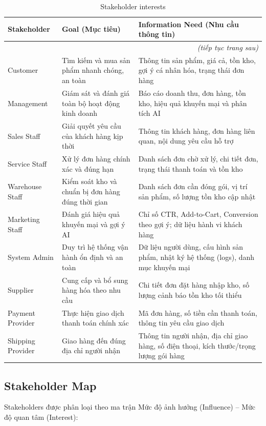 \documentclass[12pt,a4paper,oneside]{report}
\begin{document}
\begin{longtable}{p{3.2cm}p{5cm}p{7.8cm}}
\caption{Stakeholder interests}\\
\toprule
\textbf{Stakeholder} & \textbf{Goal (Mục tiêu)} & \textbf{Information Need (Nhu cầu thông tin)} \\
\midrule
\endhead
\midrule
\multicolumn{3}{r}{\emph{(tiếp tục trang sau)}} \\
\endfoot
\bottomrule
\endlastfoot
Customer & Tìm kiếm và mua sản phẩm nhanh chóng, an toàn & Thông tin sản phẩm, giá cả, tồn kho, gợi ý cá nhân hóa, trạng thái đơn hàng \\
Management & Giám sát và đánh giá toàn bộ hoạt động kinh doanh & Báo cáo doanh thu, đơn hàng, tồn kho, hiệu quả khuyến mại và phân tích AI \\
Sales Staff &  Giải quyết yêu cầu của khách hàng kịp thời &  Thông tin khách hàng, đơn hàng liên quan, nội dung yêu cầu hỗ trợ \\
Service Staff & Xử lý đơn hàng chính xác và đúng hạn & Danh sách đơn chờ xử lý, chi tiết đơn, trạng thái thanh toán và tồn kho \\
Warehouse Staff & Kiểm soát kho và chuẩn bị đơn hàng đúng thời gian & Danh sách đơn cần đóng gói, vị trí sản phẩm, số lượng tồn kho cập nhật \\
Marketing Staff & Đánh giá hiệu quả khuyến mại và gợi ý AI & Chỉ số CTR, Add-to-Cart, Conversion theo gợi ý; dữ liệu hành vi khách hàng \\
System Admin & Duy trì hệ thống vận hành ổn định và an toàn & Dữ liệu người dùng, cấu hình sản phẩm, nhật ký hệ thống (logs), danh mục khuyến mại \\
Supplier & Cung cấp và bổ sung hàng hóa theo nhu cầu & Chi tiết đơn đặt hàng nhập kho, số lượng cảnh báo tồn kho tối thiểu \\
Payment Provider & Thực hiện giao dịch thanh toán chính xác & Mã đơn hàng, số tiền cần thanh toán, thông tin yêu cầu giao dịch \\
Shipping Provider & Giao hàng đến đúng địa chỉ người nhận & Thông tin người nhận, địa chỉ giao hàng, số điện thoại, kích thước/trọng lượng gói hàng \\
\end{longtable}

\subsection{Stakeholder Map}

Stakeholders được phân loại theo ma trận Mức độ ảnh hưởng (Influence) -- Mức độ quan tâm (Interest):
\end{document}
